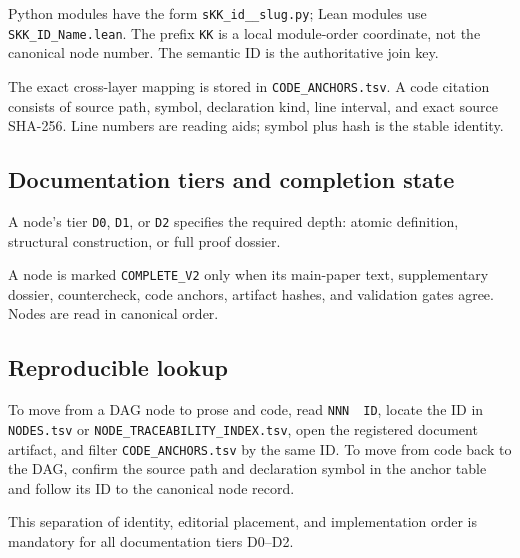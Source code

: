 Python modules have the form \texttt{sKK\_id\_\_slug.py}; Lean modules use \texttt{SKK\_ID\_Name.lean}.  The prefix \texttt{KK} is a local module-order coordinate, not the canonical node number.  The semantic ID is the authoritative join key.

The exact cross-layer mapping is stored in \texttt{CODE\_ANCHORS.tsv}.  A code citation consists of source path, symbol, declaration kind, line interval, and exact source SHA-256.  Line numbers are reading aids; symbol plus hash is the stable identity.


\subsection*{Documentation tiers and completion state}
A node's tier \texttt{D0}, \texttt{D1}, or \texttt{D2} specifies the required depth: atomic definition, structural construction, or full proof dossier.

A node is marked \texttt{COMPLETE\_V2} only when its main-paper text, supplementary dossier, countercheck, code anchors, artifact hashes, and validation gates agree. Nodes are read in canonical order.

\subsection*{Reproducible lookup}
To move from a DAG node to prose and code, read \texttt{NNN}~\textperiodcentered~\texttt{ID}, locate the ID in \texttt{NODES.tsv} or \texttt{NODE\_TRACEABILITY\_INDEX.tsv}, open the registered document artifact, and filter \texttt{CODE\_ANCHORS.tsv} by the same ID.  To move from code back to the DAG, confirm the source path and declaration symbol in the anchor table and follow its ID to the canonical node record.

This separation of identity, editorial placement, and implementation order is mandatory for all documentation tiers D0--D2.
